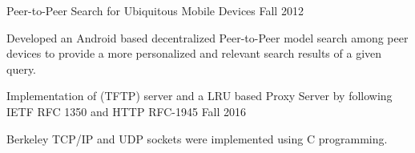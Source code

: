 \begin{cvprojects}
  \cvproject
    {}
    {Peer-to-Peer Search for Ubiquitous Mobile Devices} %
    {Fall 2012} %
    {}
    {
      \begin{cvitems} %
        \item {Developed an Android based decentralized Peer-to-Peer model search among peer devices to provide a more
personalized and relevant search results of a given query.}
      \end{cvitems}
    }

  \cvproject
    {}
    {Implementation of (TFTP) server and a LRU based Proxy Server by following IETF RFC 1350 and HTTP RFC-1945} %
    {Fall 2016} %
    {}
    {
      \begin{cvitems} %
      \item{Berkeley TCP/IP and UDP sockets were implemented using C programming.}
      \end{cvitems}
    }

\end{cvprojects}
